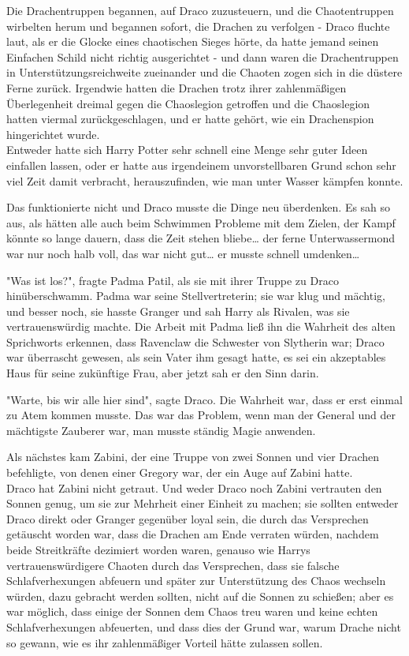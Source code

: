 {Die Drachentruppen begannen, auf Draco zuzusteuern, und die Chaotentruppen wirbelten herum und begannen sofort, die Drachen zu verfolgen - Draco fluchte laut, als er die Glocke eines chaotischen Sieges hörte, da hatte jemand seinen Einfachen Schild nicht richtig ausgerichtet - und dann waren die Drachentruppen in Unterstützungsreichweite zueinander und die Chaoten zogen sich in die düstere Ferne zurück. Irgendwie hatten die Drachen trotz ihrer zahlenmäßigen Überlegenheit dreimal gegen die Chaoslegion getroffen und die Chaoslegion hatten viermal zurückgeschlagen, und er hatte gehört, wie ein Drachenspion hingerichtet wurde.\\ Entweder hatte sich Harry Potter sehr schnell eine Menge sehr guter Ideen einfallen lassen, oder er hatte aus irgendeinem unvorstellbaren Grund schon sehr viel Zeit damit verbracht, herauszufinden, wie man unter Wasser kämpfen konnte.

Das funktionierte nicht und Draco musste die Dinge neu überdenken. Es sah so aus, als hätten alle auch beim Schwimmen Probleme mit dem Zielen, der Kampf könnte so lange dauern, dass die Zeit stehen bliebe… der ferne Unterwassermond war nur noch halb voll, das war nicht gut… er musste schnell umdenken…

"Was ist los?", fragte Padma Patil, als sie mit ihrer Truppe zu Draco hinüberschwamm. Padma war seine Stellvertreterin; sie war klug und mächtig, und besser noch, sie hasste Granger und sah Harry als Rivalen, was sie vertrauenswürdig machte. Die Arbeit mit Padma ließ ihn die Wahrheit des alten Sprichworts erkennen, dass Ravenclaw die Schwester von Slytherin war; Draco war überrascht gewesen, als sein Vater ihm gesagt hatte, es sei ein akzeptables Haus für seine zukünftige Frau, aber jetzt sah er den Sinn darin.

"Warte, bis wir alle hier sind", sagte Draco. Die Wahrheit war, dass er erst einmal zu Atem kommen musste. Das war das Problem, wenn man der General und der mächtigste Zauberer war, man musste ständig Magie anwenden.

Als nächstes kam Zabini, der eine Truppe von zwei Sonnen und vier Drachen befehligte, von denen einer Gregory war, der ein Auge auf Zabini hatte.\\ Draco hat Zabini nicht getraut. Und weder Draco noch Zabini vertrauten den Sonnen genug, um sie zur Mehrheit einer Einheit zu machen; sie sollten entweder Draco direkt oder Granger gegenüber loyal sein, die durch das Versprechen getäuscht worden war, dass die Drachen am Ende verraten würden, nachdem beide Streitkräfte dezimiert worden waren, genauso wie Harrys vertrauenswürdigere Chaoten durch das Versprechen, dass sie falsche Schlafverhexungen abfeuern und später zur Unterstützung des Chaos wechseln würden, dazu gebracht werden sollten, nicht auf die Sonnen zu schießen; aber es war möglich, dass einige der Sonnen dem Chaos treu waren und keine echten Schlafverhexungen abfeuerten, und dass dies der Grund war, warum Drache nicht so gewann, wie es ihr zahlenmäßiger Vorteil hätte zulassen sollen.

}
